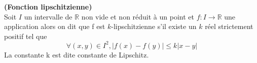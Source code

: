 \begin{frdefinition}\textbf {(Fonction lipschitzienne)} \\
Soit $I$ un intervalle de $\mathbb{R}$ non vide et non r\'eduit \`a un point et 
$f:I\rightarrow \mathbb{R}$ une application alors on dit que f est 
$k$-lipschitzienne s'il existe un $k$ r\'eel strictement positif tel que
\begin{equation}
 \forall (x,y)\in I^2, |f(x)-f(y)|\leq k|x-y|
\end{equation}
La constante k est dite constante de Lipschitz.
\end{frdefinition}



